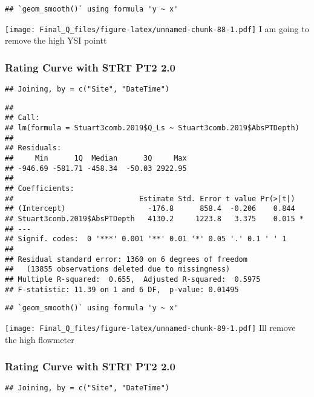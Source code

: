 \documentclass[
]{article}
\begin{document}
\begin{verbatim}
## `geom_smooth()` using formula 'y ~ x'
\end{verbatim}

\texttt{[image: Final\_Q\_files/figure-latex/unnamed-chunk-88-1.pdf]} I am
going to remove the high YSI pointt

\hypertarget{rating-curve-with-strt-pt2-2.0}{%
\subsubsection{Rating Curve with STRT PT2
2.0}\label{rating-curve-with-strt-pt2-2.0}}

\begin{verbatim}
## Joining, by = c("Site", "DateTime")
\end{verbatim}

\begin{verbatim}
## 
## Call:
## lm(formula = Stuart3comb.2019$Q_Ls ~ Stuart3comb.2019$AbsPTDepth)
## 
## Residuals:
##     Min      1Q  Median      3Q     Max 
## -946.69 -581.71 -458.34  -50.03 2922.95 
## 
## Coefficients:
##                             Estimate Std. Error t value Pr(>|t|)  
## (Intercept)                   -176.8      858.4  -0.206    0.844  
## Stuart3comb.2019$AbsPTDepth   4130.2     1223.8   3.375    0.015 *
## ---
## Signif. codes:  0 '***' 0.001 '**' 0.01 '*' 0.05 '.' 0.1 ' ' 1
## 
## Residual standard error: 1360 on 6 degrees of freedom
##   (13855 observations deleted due to missingness)
## Multiple R-squared:  0.655,  Adjusted R-squared:  0.5975 
## F-statistic: 11.39 on 1 and 6 DF,  p-value: 0.01495
\end{verbatim}

\begin{verbatim}
## `geom_smooth()` using formula 'y ~ x'
\end{verbatim}

\texttt{[image: Final\_Q\_files/figure-latex/unnamed-chunk-89-1.pdf]} Ill
remove the high flowmeter

\hypertarget{rating-curve-with-strt-pt2-2.0-1}{%
\subsubsection{Rating Curve with STRT PT2
2.0}\label{rating-curve-with-strt-pt2-2.0-1}}

\begin{verbatim}
## Joining, by = c("Site", "DateTime")
\end{verbatim}
\end{document}
